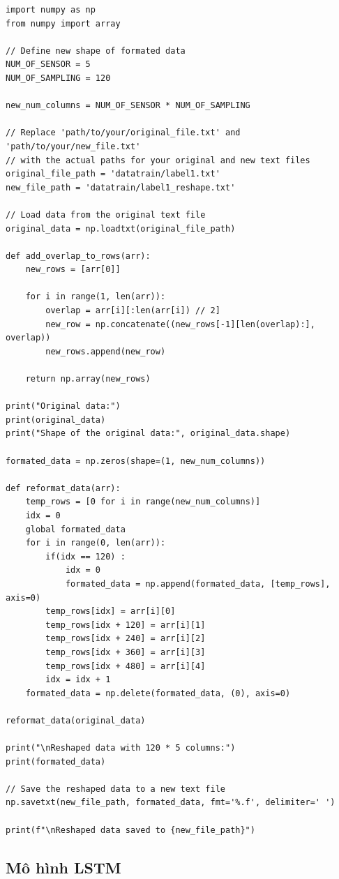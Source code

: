 \begin{lstlisting}
import numpy as np
from numpy import array

// Define new shape of formated data
NUM_OF_SENSOR = 5
NUM_OF_SAMPLING = 120

new_num_columns = NUM_OF_SENSOR * NUM_OF_SAMPLING

// Replace 'path/to/your/original_file.txt' and 'path/to/your/new_file.txt'
// with the actual paths for your original and new text files
original_file_path = 'datatrain/label1.txt'
new_file_path = 'datatrain/label1_reshape.txt'

// Load data from the original text file
original_data = np.loadtxt(original_file_path)

def add_overlap_to_rows(arr):
    new_rows = [arr[0]]
    
    for i in range(1, len(arr)):
        overlap = arr[i][:len(arr[i]) // 2]
        new_row = np.concatenate((new_rows[-1][len(overlap):], overlap))
        new_rows.append(new_row)

    return np.array(new_rows)

print("Original data:")
print(original_data)
print("Shape of the original data:", original_data.shape)

formated_data = np.zeros(shape=(1, new_num_columns))

def reformat_data(arr):
    temp_rows = [0 for i in range(new_num_columns)] 
    idx = 0
    global formated_data
    for i in range(0, len(arr)):
        if(idx == 120) :
            idx = 0
            formated_data = np.append(formated_data, [temp_rows], axis=0)
        temp_rows[idx] = arr[i][0]
        temp_rows[idx + 120] = arr[i][1]
        temp_rows[idx + 240] = arr[i][2]
        temp_rows[idx + 360] = arr[i][3]
        temp_rows[idx + 480] = arr[i][4]
        idx = idx + 1
    formated_data = np.delete(formated_data, (0), axis=0)

reformat_data(original_data)

print("\nReshaped data with 120 * 5 columns:")
print(formated_data)

// Save the reshaped data to a new text file
np.savetxt(new_file_path, formated_data, fmt='%.f', delimiter=' ')

print(f"\nReshaped data saved to {new_file_path}")
\end{lstlisting}

\subsection{Mô hình LSTM}

